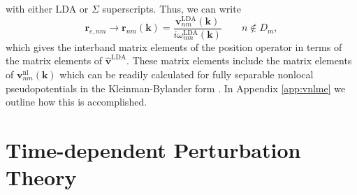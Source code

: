 with either LDA or $\Sigma$ superscripts. Thus, we can write
\begin{equation}\label{chon.98}
\mathbf{r}_{e,nm}\to\mathbf{r}_{nm}(\mathbf{k}) =
\frac{\mathbf{v}^\mathrm{LDA}_{nm}(\mathbf{k})}
     {i\omega^{\mathrm{LDA}}_{nm}(\mathbf{k})}
\qquad n\notin D_{m},
\end{equation}   
which gives the interband matrix elements of the position operator in terms of
the matrix elements of $\hat{\mathbf{v}}^\mathrm{LDA}$. These matrix elements
include the matrix elements of $\mathbf{v}^{\mathrm{nl}}_{nm}(\mathbf{k})$ which
can be readily calculated for fully separable nonlocal pseudopotentials in the
Kleinman-Bylander form \cite{mottaCMS10, kleinmanPRL82, adolphPRB96}. In
Appendix \ref{app:vnlme} we outline how this is accomplished.



\section{Time-dependent Perturbation Theory}\label{tdpt}

